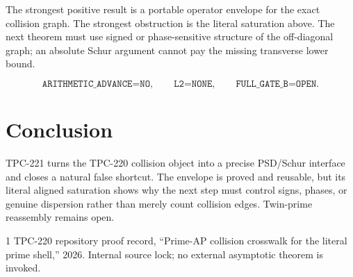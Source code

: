 \documentclass[11pt]{article}
\begin{document}
The strongest positive result is a portable operator envelope for the exact collision graph.
The strongest obstruction is the literal saturation above.  The next theorem must use
signed or phase-sensitive structure of the off-diagonal graph; an absolute Schur argument
cannot pay the missing transverse lower bound.

\[
 \texttt{ARITHMETIC\_ADVANCE=NO},\qquad
 \texttt{L2=NONE},\qquad
 \texttt{FULL\_GATE\_B=OPEN}.
\]

\section{Conclusion}

TPC-221 turns the TPC-220 collision object into a precise PSD/Schur interface and closes a
natural false shortcut.  The envelope is proved and reusable, but its literal aligned
saturation shows why the next step must control signs, phases, or genuine dispersion rather
than merely count collision edges.  Twin-prime reassembly remains open.

\begin{thebibliography}{1}
TPC-220 repository proof record, ``Prime-AP collision crosswalk for the literal prime
shell,'' 2026.  Internal source lock; no external asymptotic theorem is invoked.
\end{thebibliography}
\end{document}
